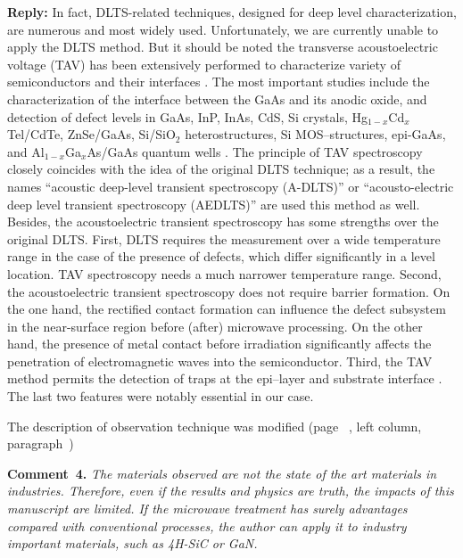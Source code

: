 \documentclass[10pt]{iopart}
\begin{document}
\noindent
\textcolor[rgb]{0.51,0.00,0.00}{\textbf{Reply:}}
In fact, DLTS-related techniques, designed for deep level characterization,
are numerous and most widely used.
Unfortunately, we are currently unable to apply the DLTS method.
But it should be noted the transverse acoustoelectric voltage (TAV)
has been extensively performed to characterize variety of  semiconductors and their
interfaces
\cite{TAV:1992ZnSeGaAsphoto,TAV:2003MIS_hetero,TAV:1989hetero,TAV:1993general,TAV:1991SiSiO2,TAV:1989SiGaAsnodefect,
TAV:1991gener,TAV:1999GaAs_AlGaAs,TAV:1993MIS,TAV:1991SiMOS,TAV:1993GaAs,OstrovPAN,OlikhSSC,OstrovskiiSST}.
The most important studies include the
characterization of the  interface between  the GaAs and  its anodic oxide,
and detection of  defect levels
in GaAs, InP, InAs, CdS, Si crystals,
Hg$_{1-x}$Cd$_x$Tel/CdTe, ZnSe/GaAs, Si/SiO$_2$ heterostructures,
Si MOS--structures,
epi-GaAs,
and Al$_{1-x}$Ga$_x$As/GaAs quantum wells
\cite{TAV:1991gener,TAV:1992ZnSeGaAsphoto,TAV:1991SiSiO2,OlikhSSC,TAV:1993MIS,TAV:1999GaAs_AlGaAs}.
The  principle of TAV  spectroscopy closely coincides with the idea  of  the original  DLTS
technique; as a result, the names
``acoustic  deep-level  transient spectroscopy
(A-DLTS)''
 \cite{TAV:2003MIS_hetero,TAV:1999GaAs_AlGaAs,TAV:1993MIS,TAV:1991SiMOS}
or ``acousto-electric  deep  level  transient  spectroscopy
(AEDLTS)''
\cite{TAV:1993GaAs}
are used this method as well.
Besides, the acoustoelectric transient spectroscopy has some strengths over the original  DLTS.
First, DLTS requires the measurement over a wide temperature range
in the case of the presence of defects, which differ significantly in a level location.
TAV spectroscopy needs a much narrower temperature range.
Second, the acoustoelectric transient spectroscopy does not require barrier formation.
On the one hand, the rectified contact formation can influence the defect subsystem
in the near-surface region before (after) microwave processing.
On the other hand, the presence of metal contact before irradiation
significantly affects the penetration of electromagnetic waves into the semiconductor.
Third, the TAV method permits the detection of traps at the
epi–layer and substrate interface \cite{OstrovPAN,OlikhSSC,OstrovskiiSST}.
The last two features were notably essential in our case.


The description of observation technique was modified 
(page~ , left column, paragraph~)



\vspace{1cm}
\noindent
\textcolor[rgb]{0.00,0.50,1.00}{\textbf{Comment~4.}}
\emph{The materials observed are not the state of the art materials in industries.
Therefore, even if the results and physics are truth,
the impacts of this manuscript are limited.
If the microwave treatment has surely advantages compared
with conventional processes, the author can apply it to industry important materials, such as 4H-SiC or GaN.}
\end{document}
